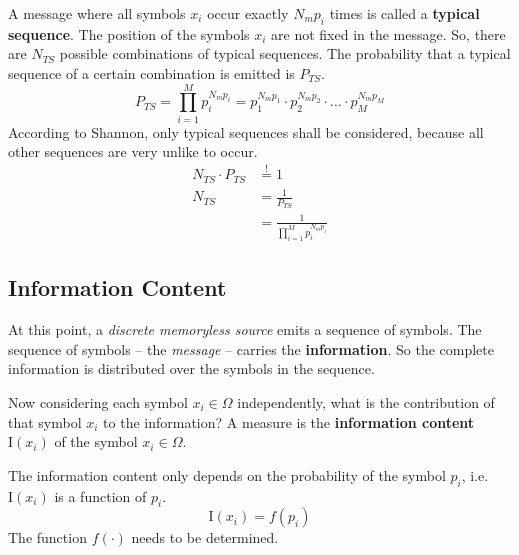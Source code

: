 \begin{refsection}
A message where all symbols $x_i$ occur exactly $N_m p_i$ times is called a \textbf{typical sequence}. The position of the symbols $x_i$ are not fixed in the message. So, there are $N_{TS}$ possible combinations of typical sequences. The probability that a typical sequence of a certain combination is emitted is $P_{TS}$.
\begin{equation}
	P_{TS} = \prod\limits_{i = 1}^{M} p_i^{N_m p_i} = p_1^{N_m p_1} \cdot p_2^{N_m p_2} \cdot \ldots \cdot p_M^{N_m p_M}
	\label{eq:ch08:typseq_prob}
\end{equation}%
%
According to Shannon, only typical sequences shall be considered, because all other sequences are very unlike to occur.
\begin{equation}
	\begin{split}
		N_{TS} \cdot P_{TS} &\stackrel{!}{=} 1 \\
		N_{TS} &= \frac{1}{P_{TS}} \\
		 &= \frac{1}{\prod\limits_{i = 1}^{M} p_i^{N_m p_i}}
	\end{split}
\end{equation}

\subsection{Information Content}

At this point, a \emph{discrete memoryless source} emits a sequence of symbols. The sequence of symbols -- the \emph{message} -- carries the  \textbf{information}. So the complete information is distributed over the symbols in the sequence.

Now considering each symbol $x_i \in \Omega$ independently, what is the contribution of that symbol $x_i$ to the information? A measure is the  \textbf{information content} $\mathrm{I}(x_i)$ of the symbol $x_i \in \Omega$. 

The information content only depends on the probability of the symbol $p_i$, i.e. $\mathrm{I}(x_i)$ is a function of $p_i$.
\begin{equation}
	\mathrm{I}(x_i) = f(p_i)
\end{equation}
The function $f(\cdot)$ needs to be determined.


\end{refsection}
